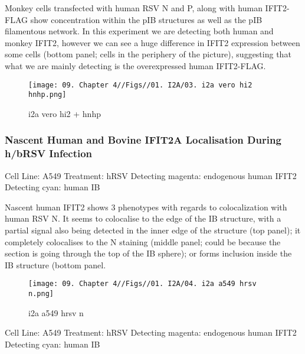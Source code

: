 Monkey cells transfected with human RSV N and P, along with human IFIT2-FLAG show concentration within the pIB structures as well as the pIB filamentous network. In this experiment we are detecting both human and monkey IFIT2, however we can see a huge difference in IFIT2 expression between some cells (bottom panel; cells in the periphery of the picture), suggesting that what we are mainly detecting is the overexpressed human IFIT2-FLAG.

\begin{figure}
    \centering
    \texttt{[image: 09. Chapter 4//Figs//01. I2A/03. i2a vero hi2 hnhp.png]}
    \caption[i2a vero hi2 + hnhp]{i2a vero hi2 + hnhp}
    \label{i2a vero hi2 + hnhp}
\end{figure}

\subsubsection{Nascent Human and Bovine IFIT2A Localisation During h/bRSV Infection} \label{Nascent Human and Bovine IFIT2A Localisation During h/bRSV Infection}
Cell Line: A549 \newline
Treatment: hRSV \newline
Detecting magenta: endogenous human IFIT2  \newline
Detecting cyan: human IB \newline

Nascent human IFIT2 shows 3 phenotypes with regards to colocalization with human RSV N. It seems to colocalise to the edge of the IB structure, with a partial signal also being detected in the inner edge of the structure (top panel); it completely colocalises to the N staining (middle panel; could be because the section is going through the top of the IB sphere); or forms inclusion inside the IB structure (bottom panel. 

\begin{figure}
    \centering
    \texttt{[image: 09. Chapter 4//Figs//01. I2A/04. i2a a549 hrsv n.png]}
    \caption[i2a a549 hrsv n]{i2a a549 hrsv n}
    \label{i2a a549 hrsv n}
\end{figure}

Cell Line: A549 \newline
Treatment: hRSV \newline
Detecting magenta: endogenous human IFIT2  \newline
Detecting cyan: human IB \newline

